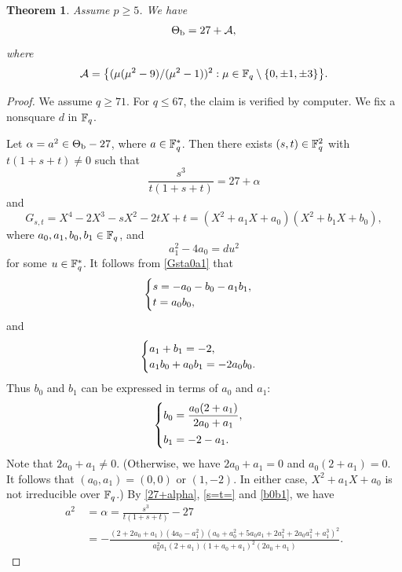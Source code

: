 \documentclass{amsart}
\newtheorem{thm}{Theorem}[section]
\numberwithin{equation}{section}
\theoremstyle{definition}
\newcommand{\f}{\Bbb F}
\begin{document}
\begin{thm}\label{thm1}
Assume $p\ge 5$. We have 
\[
\Theta_{\rm b}=27+\mathcal A,
\]
where
\[
\mathcal A=\bigl\{(\mu(\mu^2-9)/(\mu^2-1))^2: \mu\in\f_q\setminus\{0,\pm1,\pm3\}\bigr\}.
\]
\end{thm}

\begin{proof}
We assume $q\ge 71$. For $q\le 67$, the claim is verified by computer. We fix a nonsquare $d$ in $\f_q$.

\medskip
Let $\alpha=a^2\in\Theta_{\rm b}-27$, where $a\in\f_q^*$. Then there exists $(s,t)\in\f_q^2$ with $t(1+s+t)\ne 0$ such that
\begin{equation}\label{27+alpha}
\frac{s^3}{t(1+s+t)}=27+\alpha
\end{equation}
and
\begin{equation}\label{Gsta0a1}
G_{s,t}=X^4-2X^3-sX^2-2tX+t=(X^2+a_1X+a_0)(X^2+b_1X+b_0),
\end{equation}
where $a_0,a_1,b_0,b_1\in\f_q$, and
\begin{equation}\label{du2}
a_1^2-4a_0=du^2
\end{equation}
for some $u\in\f_q^*$. It follows from \eqref{Gsta0a1} that
\begin{equation}\label{s=t=}
\begin{cases}
s=-a_0-b_0-a_1b_1,\cr
t=a_0b_0,
\end{cases}
\end{equation}
and
\[
\begin{cases}
a_1+b_1=-2,\cr
a_1b_0+a_0b_1=-2a_0b_0.
\end{cases}
\]
Thus $b_0$ and $b_1$ can be expressed in terms of $a_0$ and $a_1$:
\begin{equation}\label{b0b1}
\begin{cases}
b_0=\displaystyle\frac{a_0(2+a_1)}{2a_0+a_1},\vspace{0.4em}\cr
b_1=-2-a_1.
\end{cases}
\end{equation}
Note that $2a_0+a_1\ne 0$. (Otherwise, we have $2a_0+a_1=0$ and $a_0(2+a_1)=0$. It follows that $(a_0,a_1)=(0,0)$ or $(1,-2)$. In either case, $X^2+a_1X+a_0$ is not irreducible over $\f_q$.)
By \eqref{27+alpha}, \eqref{s=t=} and \eqref{b0b1}, we have
\begin{align}\label{a^2}
a^2\,&=\alpha=\frac{s^3}{t(1+s+t)}-27\\
&=-\frac{(2+2 a_0+a_1) (4 a_0-a_1^2) (a_0+a_0^2+5 a_0 a_1+2 a_1^2+2 a_0 a_1^2+a_1^3)^2}{a_0^2 a_1 (2+a_1) (1+a_0+a_1)^2 (2 a_0+a_1)}. \nonumber

\end{align}
\end{proof}
\end{document}
